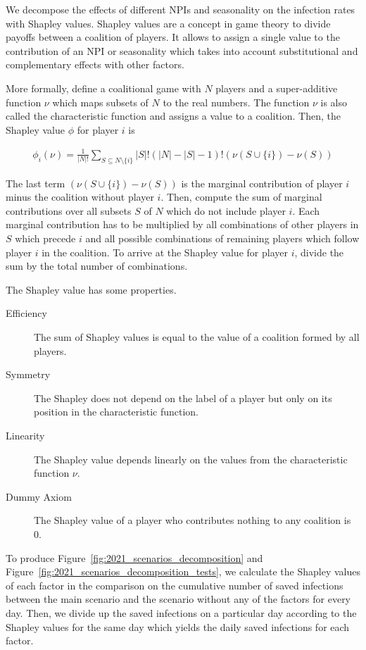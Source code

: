 We decompose the effects of different NPIs and seasonality on the infection rates with
Shapley values. Shapley values \citep{Shapley2016} are a concept in game theory to
divide payoffs between a coalition of players. It allows to assign a single value to the
contribution of an NPI or seasonality which takes into account substitutional and
complementary effects with other factors.

More formally, define a coalitional game with $N$ players and a super-additive function
$\nu$ which maps subsets of $N$ to the real numbers. The function $\nu$ is also called
the characteristic function and assigns a value to a coalition. Then, the Shapley value
$\phi$ for player $i$ is

\begin{align*}
    \phi_i(\nu) = \frac{1}{|N| !} \sum_{S \subseteq N \setminus \{i\}} |S| ! (|N| - |S| - 1)! (\nu(S \cup \{i\}) - \nu(S))
\end{align*}

The last term $(\nu(S \cup \{i\}) - \nu(S))$ is the marginal contribution of player $i$
minus the coalition without player $i$. Then, compute the sum of marginal contributions
over all subsets $S$ of $N$ which do not include player $i$. Each marginal contribution
has to be multiplied by all combinations of other players in $S$ which precede $i$ and
all possible combinations of remaining players which follow player $i$ in the coalition.
To arrive at the Shapley value for player $i$, divide the sum by the total number of
combinations.

The Shapley value has some properties.

\begin{description}
  \item[Efficiency] The sum of Shapley values is equal to the value of a coalition
  formed by all players.
  \item[Symmetry] The Shapley does not depend on the label of a player but only on its
  position in the characteristic function.
  \item[Linearity] The Shapley value depends linearly on the values from the
  characteristic function $\nu$.
  \item[Dummy Axiom] The Shapley value of a player who contributes nothing to any
  coalition is 0.
\end{description}

To produce Figure~\ref{fig:2021_scenarios_decomposition} and
Figure~\ref{fig:2021_scenarios_decomposition_tests}, we calculate the Shapley values of
each factor in the comparison on the cumulative number of saved infections between the
main scenario and the scenario without any of the factors for every day. Then, we divide
up the saved infections on a particular day according to the Shapley values for the same
day which yields the daily saved infections for each factor.


